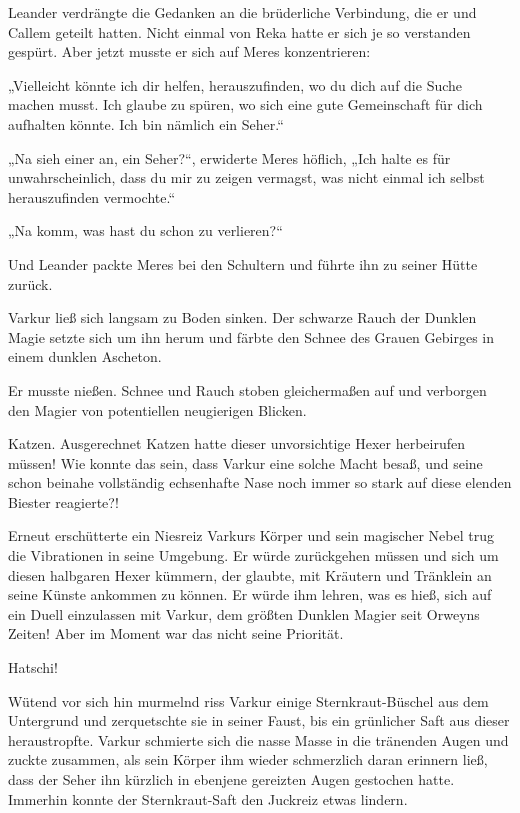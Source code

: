Leander verdrängte die Gedanken an die brüderliche Verbindung, die er und Callem geteilt hatten. Nicht einmal von Reka hatte er sich je so verstanden gespürt. Aber jetzt musste er sich auf Meres konzentrieren:

„Vielleicht könnte ich dir helfen, herauszufinden, wo du dich auf die Suche machen musst. Ich glaube zu spüren, wo sich eine gute Gemeinschaft für dich aufhalten könnte. Ich bin nämlich ein Seher.“

„Na sieh einer an, ein Seher?“, erwiderte Meres höflich, „Ich halte es für unwahrscheinlich, dass du mir zu zeigen vermagst, was nicht einmal ich selbst herauszufinden vermochte.“

„Na komm, was hast du schon zu verlieren?“

Und Leander packte Meres bei den Schultern und führte ihn zu seiner Hütte zurück.



\trennzeichen



Varkur ließ sich langsam zu Boden sinken. Der schwarze Rauch der Dunklen Magie setzte sich um ihn herum und färbte den Schnee des Grauen Gebirges in einem dunklen Ascheton.

Er musste nießen. Schnee und Rauch stoben gleichermaßen auf und verborgen den Magier von potentiellen neugierigen Blicken.

Katzen. Ausgerechnet Katzen hatte dieser unvorsichtige Hexer herbeirufen müssen! Wie konnte das sein, dass Varkur eine solche Macht besaß, und seine schon beinahe vollständig echsenhafte Nase noch immer so stark auf diese elenden Biester reagierte?!

Erneut erschütterte ein Niesreiz Varkurs Körper und sein magischer Nebel trug die Vibrationen in seine Umgebung. Er würde zurückgehen müssen und sich um diesen halbgaren Hexer kümmern, der glaubte, mit Kräutern und Tränklein an seine Künste ankommen zu können. Er würde ihm lehren, was es hieß, sich auf ein Duell einzulassen mit Varkur, dem größten Dunklen Magier seit Orweyns Zeiten! Aber im Moment war das nicht seine Priorität.

Hatschi!

Wütend vor sich hin murmelnd riss Varkur einige Sternkraut-Büschel aus dem Untergrund und zerquetschte sie in seiner Faust, bis ein grünlicher Saft aus dieser heraustropfte. Varkur schmierte sich die nasse Masse in die tränenden Augen und zuckte zusammen, als sein Körper ihm wieder schmerzlich daran erinnern ließ, dass der Seher ihn kürzlich in ebenjene gereizten Augen gestochen hatte. Immerhin konnte der Sternkraut-Saft den Juckreiz etwas lindern.

